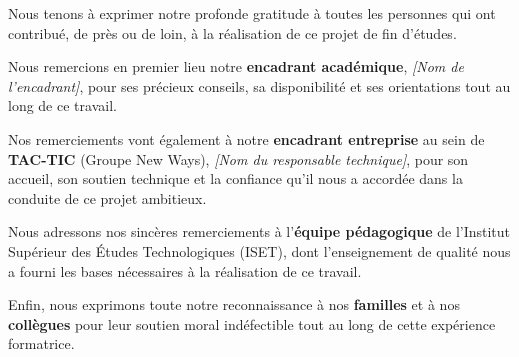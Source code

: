Nous tenons à exprimer notre profonde gratitude à toutes les personnes qui ont
contribué, de près ou de loin, à la réalisation de ce projet de fin d'études.

\medskip
Nous remercions en premier lieu notre \textbf{encadrant académique},
\textit{[Nom de l'encadrant]}, pour ses précieux conseils, sa disponibilité
et ses orientations tout au long de ce travail.

\medskip
Nos remerciements vont également à notre \textbf{encadrant entreprise} au sein
de \textbf{TAC-TIC} (Groupe New Ways), \textit{[Nom du responsable technique]},
pour son accueil, son soutien technique et la confiance qu'il nous a accordée
dans la conduite de ce projet ambitieux.

\medskip
Nous adressons nos sincères remerciements à l'\textbf{équipe pédagogique} de
l'Institut Supérieur des Études Technologiques (ISET), dont l'enseignement de
qualité nous a fourni les bases nécessaires à la réalisation de ce travail.

\medskip
Enfin, nous exprimons toute notre reconnaissance à nos \textbf{familles} et
à nos \textbf{collègues} pour leur soutien moral indéfectible tout au long de
cette expérience formatrice.
